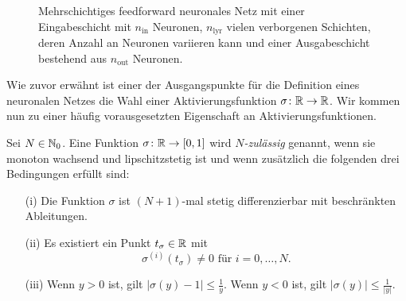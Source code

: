 \begin{center}
\begin{figure}
        \caption{Mehrschichtiges feedforward neuronales Netz mit einer Eingabeschicht mit $n_{\mathrm{in}}$ Neuronen, $n_{\mathrm{lyr}}$ vielen verborgenen Schichten, deren Anzahl an Neuronen variieren kann und einer Ausgabeschicht bestehend aus $n_{\mathrm{out}}$ Neuronen.}
        \label{fig:DNN}
    \end{figure}
\end{center}

Wie zuvor erwähnt ist einer der Ausgangspunkte für die Definition eines neuronalen Netzes die Wahl einer Aktivierungsfunktion $\sigma\colon \mathbb{R} \to \mathbb{R}$. Wir kommen nun zu einer häufig vorausgesetzten Eigenschaft an Aktivierungsfunktionen.
\begin{defn}
\label{nzulässig}
Sei $N \in \mathbb{N}_0$. Eine Funktion $\sigma\colon \mathbb{R} \to [0, 1]$ wird \emph{$N$-zulässig} genannt, wenn sie monoton wachsend und lipschitzstetig ist und wenn zusätzlich die folgenden drei Bedingungen erfüllt sind:
\begin{itemize}
\item[(i)] Die Funktion $\sigma$ ist $(N + 1)$-mal stetig differenzierbar mit beschränkten Ableitungen.
\item[(ii)] Es existiert ein Punkt $t_{\sigma} \in \mathbb{R}$ mit $$\sigma^{(i)}(t_{\sigma}) \neq 0 \text{ für } i = 0,\dots,N.$$
\item[(iii)] Wenn $y > 0$ ist, gilt $|\sigma(y) - 1| \leq \frac{1}{y}$. Wenn $y < 0$ ist, gilt $|\sigma(y)| \leq \frac{1}{|y|}$.
\end{itemize}  
\end{defn}  

